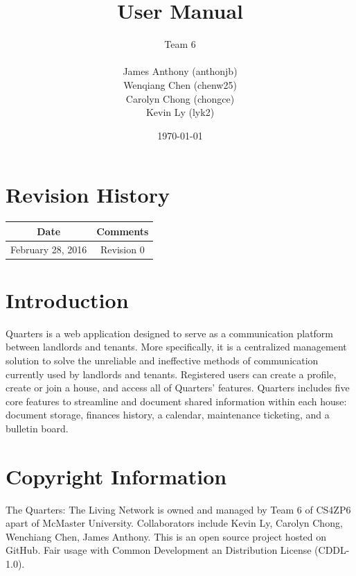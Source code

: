 \documentclass[12pt]{article}
\begin{document}
    \title{User Manual}
    \author{Team 6\\ \\James Anthony (anthonjb)\\ Wenqiang Chen (chenw25)\\ Carolyn Chong
        (chongce)\\ Kevin Ly (lyk2)}
    \date{\today}

    \maketitle

    \pagebreak

    \tableofcontents
    \listoffigures

    \section*{Revision History}
    \begin{tabular}{|c|c|}
        \hline
        \textbf{Date}  & \textbf{Comments} \\ \hline
        February 28, 2016 & Revision 0 \\ \hline
    \end{tabular}

    \pagebreak


    \section{Introduction}
	Quarters is a web application designed to serve as a communication platform between landlords and tenants. More specifically, it is a centralized management solution to solve the unreliable and ineffective methods of communication currently used by landlords and tenants. Registered users can create a profile, create or join a house, and access all of Quarters’ features. Quarters includes five core features to streamline and document shared information within each house: document storage, finances history, a calendar, maintenance ticketing, and a bulletin board. 

    \section{Copyright Information}
    The Quarters: The Living Network is owned and managed by Team 6 of CS4ZP6 apart of McMaster University. Collaborators include Kevin Ly, Carolyn Chong, Wenchiang Chen, James Anthony. This is an open source project hosted on GitHub. Fair usage with Common Development an Distribution License (CDDL-1.0).
\end{document}
